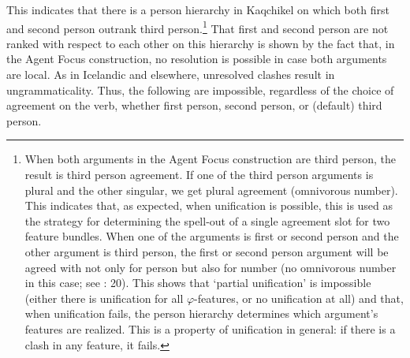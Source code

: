 \documentclass[output=paper]{langsci/langscibook}
\begin{document}
This indicates that there is a person hierarchy in Kaqchikel on which both first and second person outrank third person.\footnote{When both arguments in the Agent Focus construction are third person, the result is third person agreement. If one of the third person arguments is plural and the other singular, we get plural agreement (omnivorous number). This indicates that, as expected, when unification is possible, this is used as the strategy for determining the spell-out of a single agreement slot for two feature bundles. When one of the arguments is first or second person and the other argument is third person, the first or second person argument will be agreed with not only for person but also for number (no omnivorous number in this case; see \citealt{Preminger2014}: 20). This shows that ‘partial unification’ is impossible (either there is unification for all $\varphi $-features, or no unification at all) and that, when unification fails, the person hierarchy determines which argument’s features are realized. This is a property of unification in general: if there is a clash in any feature, it fails.} That first and second person are not ranked with respect to each other on this hierarchy is shown by the fact that, in the Agent Focus construction, no resolution is possible in case both arguments are local. As in Icelandic and elsewhere, unresolved clashes result in ungrammaticality. Thus, the following are impossible, regardless of the choice of agreement on the verb, whether first person, second person, or (default) third person.

\ea 
{}
\z
\z
\end{document}
